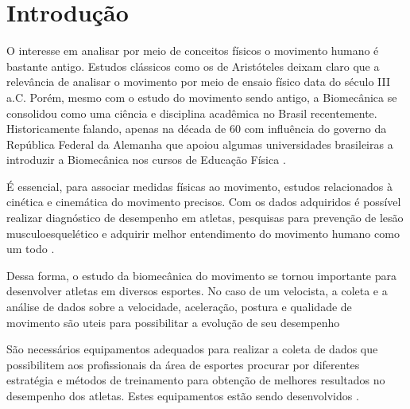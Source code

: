 
\chapter[Introdução]{Introdução}

O interesse em analisar por meio de conceitos físicos o movimento humano é bastante antigo. Estudos clássicos como os de Aristóteles deixam claro que a relevância de analisar o movimento por meio de ensaio físico data do século III a.C. Porém, mesmo com o estudo do movimento sendo antigo, a Biomecânica se consolidou como uma ciência e disciplina acadêmica no Brasil recentemente. Historicamente falando, apenas na década de 60 com influência do governo da República Federal da Alemanha que apoiou algumas universidades brasileiras a introduzir a Biomecânica nos cursos de Educação Física \cite{Acquesta2008}.

É essencial, para associar medidas físicas ao movimento,  estudos relacionados à cinética e cinemática do movimento precisos. Com os dados adquiridos é possível realizar diagnóstico de desempenho em atletas, pesquisas para prevenção de lesão musculoesquelético e adquirir melhor entendimento do movimento humano como um todo \cite{mcginnis2013}.

Dessa forma, o estudo da biomecânica do movimento se tornou importante para desenvolver atletas em diversos esportes. No caso de um velocista, a coleta e a análise de dados sobre a velocidade, aceleração, postura e qualidade de movimento são uteis para possibilitar a evolução de seu desempenho \cite{okazaki2012}

São necessários equipamentos adequados para realizar a coleta de dados que possibilitem aos profissionais da área de esportes procurar por diferentes estratégia e métodos de treinamento para obtenção de melhores resultados no desempenho dos atletas. Estes equipamentos estão sendo desenvolvidos \cite{okazaki2012}.



